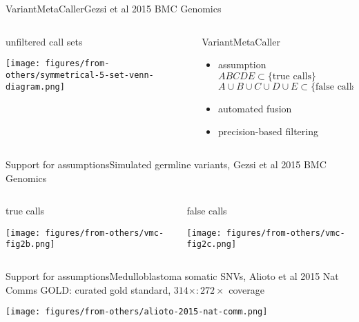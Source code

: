 \documentclass{beamer}
\begin{document}
\begin{frame}{VariantMetaCaller}{Gezsi et al 2015 BMC Genomics}

\begin{columns}[t]
\begin{column}{0.5\textwidth}{unfiltered call sets}

\texttt{[image: figures/from-others/symmetrical-5-set-venn-diagram.png]}
\end{column}

\begin{column}{0.5\textwidth}{VariantMetaCaller}
\small
\begin{itemize}
\item assumption \\
\(ABCDE \subset \{\text{true calls\}}\)
\(A\cup B\cup C\cup D\cup E \subset \{\text{false calls\}}\)
\item automated fusion%
\item precision-based filtering 
\end{itemize}
\end{column}
\end{columns}
\end{frame}

\begin{frame}{Support for assumptions}{Simulated germline
variants, Gezsi et al 2015 BMC Genomics}
\begin{columns}[t]
\begin{column}{0.5\textwidth}{true calls}

\texttt{[image: figures/from-others/vmc-fig2b.png]}
\end{column}

\begin{column}{0.5\textwidth}{false calls}

\texttt{[image: figures/from-others/vmc-fig2c.png]}
\end{column}
\end{columns}
\end{frame}

\begin{frame}{Support for assumptions}{Medulloblastoma
somatic SNVs, Alioto et al 2015 Nat Comms}{}
GOLD: curated gold standard, \(314\times
: 272\times\)
coverage

\texttt{[image: figures/from-others/alioto-2015-nat-comm.png]}
\end{frame}
\end{document}
